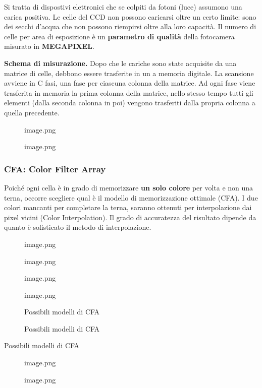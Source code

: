 \documentclass[
]{article}
\begin{document}
Si tratta di dispostivi elettronici che se colpiti da fotoni (luce) assumono una carica positiva. Le celle del CCD non possono caricarsi oltre un certo limite: sono dei secchi d'acqua che non possono riempirsi oltre alla loro capacità.
Il numero di celle per area di esposizione è un \textbf{parametro di qualità} della fotocamera misurato in \textbf{MEGAPIXEL}.

\textbf{Schema di misurazione.}
Dopo che le cariche sono state acquisite da una matrice di celle, debbono essere trasferite in un a memoria digitale. La scansione avviene in C fasi, una fase per ciascuna colonna della matrice.
Ad ogni fase viene trasferita in memoria la prima colonna della matrice, nello stesso tempo tutti gli elementi (dalla seconda colonna in poi) vengono trasferiti dalla propria colonna a quella precedente.

\begin{figure}
\centering
{image.png}
\caption{image.png}
\end{figure}

\hypertarget{cfa-color-filter-array}{%
\subsubsection{CFA: Color Filter Array}\label{cfa-color-filter-array}}

Poiché ogni cella è in grado di memorizzare \textbf{un solo colore} per volta e non una terna, occorre scegliere qual è il modello di memorizzazione ottimale (CFA).
I due colori mancanti per completare la terna, saranno ottenuti per interpolazione dai pixel vicini (Color Interpolation). Il grado di accuratezza del risultato dipende da quanto è sofisticato il metodo di interpolazione.

\begin{figure}
\centering
{image.png}
\caption{image.png}
\end{figure}

\begin{figure}
\centering
{image.png}
\caption{image.png}
\end{figure}

\begin{figure}
\centering
{Possibili modelli di CFA}
\caption{Possibili modelli di CFA}
\end{figure}

Possibili modelli di CFA

\begin{figure}
\centering
{image.png}
\caption{image.png}
\end{figure}
\end{document}
